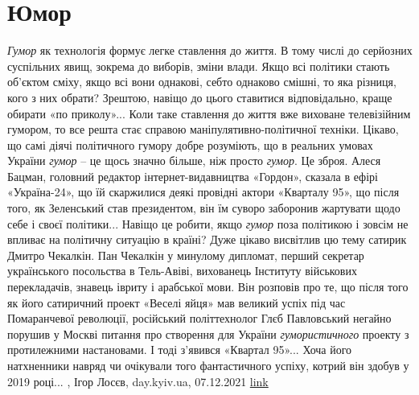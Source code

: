  
 
 
 
 
\chapter{Юмор}

\emph{Гумор} як технологія формує легке ставлення до життя. В тому числі до серйозних
суспільних явищ, зокрема до виборів, зміни влади. Якщо всі політики стають
об’єктом сміху, якщо всі вони однакові, себто однаково смішні, то яка різниця,
кого з них обрати? Зрештою, навіщо до цього ставитися відповідально, краще
обирати «по приколу»...  Коли таке ставлення до життя вже виховане телевізійним
гумором, то все решта стає справою маніпулятивно-політичної техніки.  Цікаво,
що самі діячі політичного гумору добре розуміють, що в реальних умовах України
\emph{гумор} – це щось значно більше, ніж просто \emph{гумор}. Це зброя. Алеся Бацман,
головний редактор інтернет-видавництва «Гордон», сказала в ефірі «Україна-24»,
що їй скаржилися деякі провідні актори «Кварталу 95», що після того, як
Зеленський став президентом, він їм суворо заборонив жартувати щодо себе і
своєї політики... Навіщо це робити, якщо \emph{гумор} поза політикою і зовсім не
впливає на політичну ситуацію в країні?  Дуже цікаво висвітлив цю тему сатирик
Дмитро Чекалкін. Пан Чекалкін у минулому дипломат, перший секретар українського
посольства в Тель-Авіві, вихованець Інституту військових перекладачів, знавець
івриту і арабської мови. Він розповів про те, що після того як його сатиричний
проект «Веселі яйця» мав великий успіх під час Помаранчевої революції,
російський політтехнолог Глєб Павловський негайно порушив у Москві питання про
створення для України \emph{гумористичного} проекту з протилежними настановами. І тоді
з’явився «Квартал 95»...  Хоча його натхненники навряд чи очікували того
фантастичного успіху, котрий він здобув у 2019 році...
, 
Ігор Лосєв, day.kyiv.ua, 07.12.2021
\href{https://day.kyiv.ua/uk/blog/polityka/gumor-yak-politychna-tehnologiya-ta-zbroya}{link}
